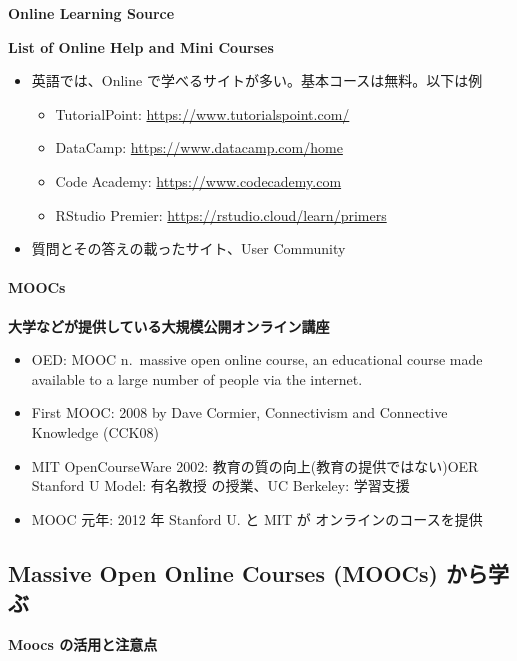 \documentclass[
]{book}
\providecommand{\tightlist}{%
  \setlength{\itemsep}{0pt}\setlength{\parskip}{0pt}}
\theoremstyle{definition}
\theoremstyle{definition}
\theoremstyle{definition}
\theoremstyle{definition}
\theoremstyle{remark}
\begin{document}
\textbf{Online Learning Source}

\textbf{List of Online Help and Mini Courses}

\begin{itemize}
\item
  英語では、Online で学べるサイトが多い。基本コースは無料。以下は例

  \begin{itemize}
  \tightlist
  \item
    TutorialPoint: \url{https://www.tutorialspoint.com/}
  \item
    DataCamp: \url{https://www.datacamp.com/home}
  \item
    Code Academy: \url{https://www.codecademy.com}
  \item
    RStudio Premier: \url{https://rstudio.cloud/learn/primers}
  \end{itemize}
\item
  質問とその答えの載ったサイト、User Community
\end{itemize}

\hypertarget{moocs}{%
\paragraph{MOOCs}\label{moocs}}

\textbf{大学などが提供している大規模公開オンライン講座}

\begin{itemize}
\tightlist
\item
  OED: MOOC n.~massive open online course, an educational course made available to a large number of people via the internet.
\item
  First MOOC: 2008 by Dave Cormier, Connectivism and Connective Knowledge (CCK08)
\item
  MIT OpenCourseWare 2002: 教育の質の向上(教育の提供ではない)OER Stanford U Model: 有名教授
  の授業、UC Berkeley: 学習支援
\item
  MOOC 元年: 2012 年 Stanford U. と MIT が オンラインのコースを提供
\end{itemize}

\hypertarget{massive-open-online-courses-moocs-ux304bux3089ux5b66ux3076}{%
\subsection{Massive Open Online Courses (MOOCs) から学ぶ}\label{massive-open-online-courses-moocs-ux304bux3089ux5b66ux3076}}

\textbf{Moocs の活用と注意点}
\end{document}
